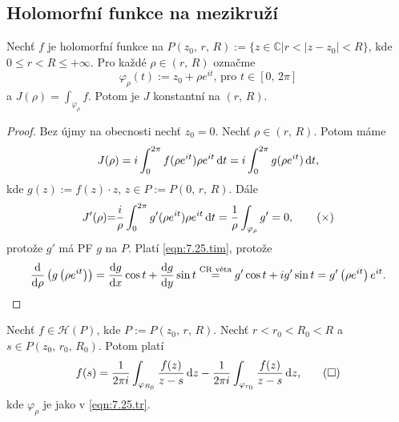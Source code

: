 
\subsection{Holomorfní funkce na mezikruží}
\begin{lemma}
Nechť $f$ je holomorfní funkce na $P(z_0,\,r,\,R):=\{z \in \mathbb{C}| r<|z-z_0|<R \}$, kde $0\leq r < R \leq + \infty$. Pro každé $\rho \in (r,\,R)$ označme
\begin{equation}
     \varphi_\rho(t):=z_0+\rho e^{it} \text{, pro } t\in [0,\,2 \pi]
     \tag{$\triangle$}
     \label{eqn:7.25.tr}
\end{equation} 
a $J(\rho)=\int_{\varphi_\rho}f$. Potom je $J$ konstantní na $(r,\,R)$.
\end{lemma}

\begin{proof}
Bez újmy na obecnosti nechť $z_0=0$. Nechť $\rho \in (r,\,R)$. Potom máme 
$$J(\rho)=i\int_0^{2\pi}f(\rho e^{it})\rho e^{it} \mathop{}\!\mathrm{d} t= \\ i\int_0^{2\pi}g(\rho e^{it})\mathop{}\!\mathrm{d} t,$$ 
kde $g(z):=f(z)\cdot z$, $z \in P:=P(0,\,r,\,R)$. Dále 
\begin{equation}
    J'(\rho){=} \frac{i}{\rho}\int_0^{2\pi}g'(\rho e^{it})\rho e^{it} \mathop{}\!\mathrm{d} t=\frac{1}{\rho}\int_{\varphi_\rho}g'=0, 
    \tag{$\times$}
    \label{eqn:7.25.tim}
\end{equation}
protože $g'$ má PF $g$ na $P$. Platí \cref{eqn:7.25.tim}, protože 
$$\frac{\mathop{}\!\mathrm{d}}{\mathop{}\!\mathrm{d} \rho}\left(g\left(\rho e^{it}\right)\right)=\frac{\mathop{}\!\mathrm{d} g}{\mathop{}\!\mathrm{d} x} \cos t+ \frac{\mathop{}\!\mathrm{d} g}{\mathop{}\!\mathrm{d} y} \sin t\stackrel{\text{CR věta}}{=}g' \cos t+ i g' \sin t=g'\left(\rho e^{it}\right)e^{it}.$$
\end{proof}

\begin{theorem}
Nechť $f \in \mathcal{H}(P)$, kde $P:=P(z_0,\,r,\,R)$. Nechť $r<r_0<R_0<R$ a $s \in P(z_0,\,r_0,\,R_0)$. Potom platí
\begin{equation}
    f(s)=\frac{1}{2 \pi i}\int_{\varphi_{R_0}}\frac{f(z)}{z-s} \mathop{}\!\mathrm{d} z - \frac{1}{2 \pi i}\int_{\varphi_{r_0}}\frac{f(z)}{z-s} \mathop{}\!\mathrm{d} z\text{,}
    \tag{$\square$}
    \label{eqn:7.26.sq}
\end{equation}
kde $\varphi_\rho$ je jako v \cref{eqn:7.25.tr}.
\end{theorem}

